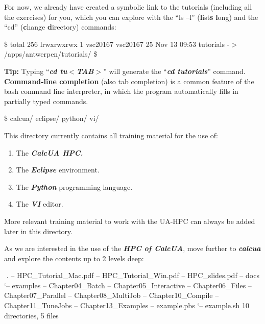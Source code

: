 For now, we already have created a symbolic link to the tutorials (including
all the exercises) for you, which you can explore with the ``ls --l''
(\textbf{l}ist\textbf{s} \textbf{l}ong) and the ``cd'' (\textbf{c}hange
\textbf{d}irectory) commands:

\begin{prompt}
\$ %
total 256
lrwxrwxrwx 1 vsc20167 vsc20167 25 Nov 13 09:53 tutorials -$>$ /apps/antwerpen/tutorials/
\$ %
\end{prompt}

\textbf{Tip: }Typing ``\textbf{\textit{cd tu$<$TAB$>$}}'' will generate the
``\textbf{\textit{cd tutorials}}'' command. \textbf{Command-line completion
}(also tab completion) is a common feature of the bash command line
interpreter, in which the program automatically fills in partially typed
commands.

\begin{prompt}
\$ %
calcua/
eclipse/
python/
vi/
\end{prompt}

This directory currently contains all training material for the use of:

\begin{enumerate}
\item  The \textbf{\textit{CalcUA HPC.}}
\item  The \textbf{\textit{Eclipse}} environment.
\item  The \textbf{\textit{Python}} programming language.
\item  The \textbf{\textit{VI}} editor.
\end{enumerate}

More relevant training material to work with the UA-HPC can always be added
later in this directory.

As we are interested in the use of the \textbf{\textit{HPC of CalcUA}}, move
further to \textbf{\textit{calcua}} and explore the contents up to 2 levels
deep:

\begin{prompt}
$ %
$ %
.
\textbar -- HPC\_Tutorial\_Mac.pdf
\textbar -- HPC\_Tutorial\_Win.pdf
\textbar -- HPC\_slides.pdf
\textbar -- docs
`-- examples
    \textbar -- Chapter04\_Batch
    \textbar -- Chapter05\_Interactive
    \textbar -- Chapter06\_Files
    \textbar -- Chapter07\_Parallel
    \textbar -- Chapter08\_MultiJob
    \textbar -- Chapter10\_Compile
    \textbar -- Chapter11\_TuneJobs
    \textbar -- Chapter13\_Examples
    \textbar -- example.pbs
    `-- example.sh
10 directories, 5 files
\end{prompt}

